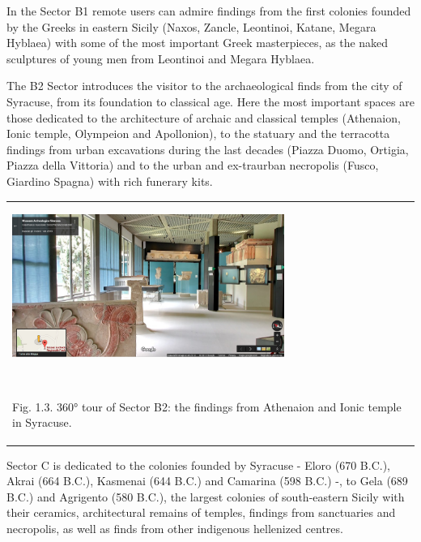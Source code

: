 \documentclass[amsthm,ebook]{saparticle}
\begin{document}
\bigskip

In the Sector B1 remote users can admire findings from the first colonies founded by the Greeks in eastern Sicily
(Naxos, Zancle, Leontinoi, Katane, Megara Hyblaea) with some of the most important Greek masterpieces, as the naked
sculptures of young men from Leontinoi and Megara Hyblaea.

The B2 Sector introduces the visitor to the archaeological finds from the city of Syracuse, from its foundation to
classical age. Here the most important spaces are those dedicated to the architecture of archaic and classical temples
(Athenaion, Ionic temple, Olympeion and Apollonion), to the statuary and the terracotta findings from urban excavations
during the last decades (Piazza Duomo, Ortigia, Piazza della Vittoria) and to the urban and ex-traurban necropolis
(Fusco, Giardino Spagna) with rich funerary kits. \ 

\begin{flushleft}
\tablefirsthead{}
\tablehead{}
\tabletail{}
\tablelasttail{}
\begin{supertabular}{m{10.681cm}}
{\centering  \includegraphics[width=8.89cm,height=4.641cm]{EAGLE2016BONACINIPilotprojectatPaoloOrsiMuseum-img003.jpg}
\par}

~

Fig. 1.3. 360° tour of Sector B2: the findings from Athenaion and Ionic temple in Syracuse. \\
\end{supertabular}
\end{flushleft}

\bigskip

Sector C is dedicated to the colonies founded by Syracuse - Eloro (670 B.C.), Akrai (664 B.C.), Kasmenai (644 B.C.) and
Camarina (598 B.C.) -, to Gela (689 B.C.) and Agrigento (580 B.C.), the largest colonies of south-eastern Sicily with
their ceramics, architectural remains of temples, findings from sanctuaries and necropolis, as well as finds from other
indigenous hellenized centres. 
\end{document}
